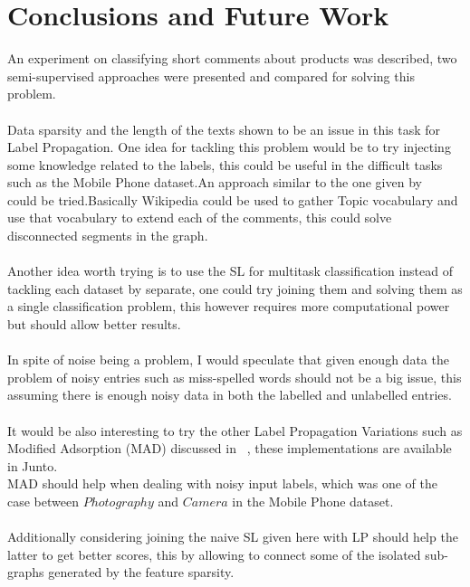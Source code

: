 \documentclass[4pt,a4paper,twocolumn]{article}
\begin{document}
\section{Conclusions and Future Work}
An experiment on classifying short comments about products was described, two semi-supervised approaches were presented and compared for solving this problem.\\
\\
Data sparsity and the length of the texts shown to be an issue in this task for Label Propagation.
One idea for tackling this problem would be to try injecting some knowledge related to the labels, this could be useful in the difficult tasks such as the Mobile Phone dataset.An approach similar to the one given by ~\cite{Gabrilovich:2006:OBB:1597348.1597395} could be tried.Basically Wikipedia could be used to gather Topic vocabulary and use that vocabulary to extend each of the comments, this could solve disconnected segments in the graph.\\
\\
Another idea worth trying is to use the SL for multitask classification instead of tackling each dataset by separate, one could try joining them and solving them as a single classification problem, this however requires more computational power but should allow better results.\\
\\
In spite of noise being a problem, I would speculate that given enough data the problem of noisy entries such as miss-spelled words should not be a big issue, this assuming there is enough noisy data in both the labelled and unlabelled entries.\\
\\
It would be also interesting to try the other Label Propagation Variations such as Modified Adsorption (MAD) discussed in ~\cite{Talukdar:2010:EGS:1858681.1858830}, these implementations are available in Junto.\\
MAD should help when dealing with noisy input labels, which was one of the case between $Photography$ and $Camera$ in the Mobile Phone dataset.\\
\\
Additionally considering joining the naive SL given here with LP should help the latter to get better scores, this by allowing to connect some of the isolated sub-graphs generated by the feature sparsity.


\end{document}
